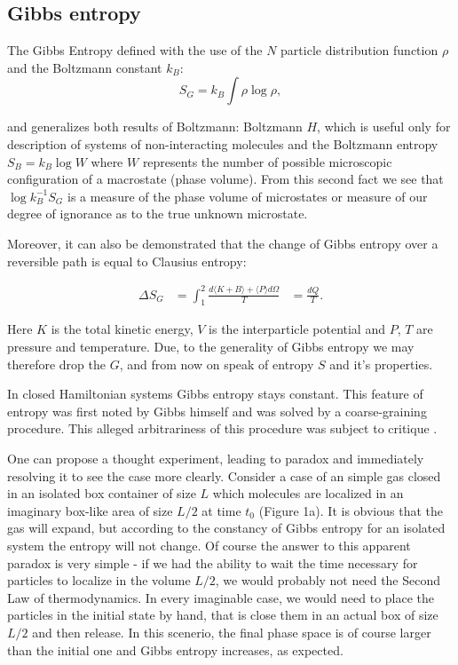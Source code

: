 \documentclass[a4paper,12pt]{article}
\begin{document}
\subsection{Gibbs entropy}
\label{Gibbs entropy}
The Gibbs Entropy defined with the use of the $N$ particle distribution function $ \rho $ and the Boltzmann constant $k_B$:
\begin{equation}
  S_G = k_B \int \rho \log{\rho},
\end{equation}

and generalizes both results of Boltzmann:
Boltzmann $H$, which is useful only for description of systems of non-interacting molecules\cite{Jaynes:1965gg} and the Boltzmann entropy $S_B = k_B \log{W}$ where $W$ represents the number of possible microscopic configuration of a macrostate (phase volume). 
From this second fact we see that $\log{k_B^{-1} S_G}$ is a measure of the phase volume of microstates or measure of our degree of ignorance as to the true unknown microstate.

Moreover, it can also be demonstrated\cite{Jaynes:1965gg} that the change of Gibbs entropy over a reversible path is equal to Clausius entropy:

\begin{equation}
\begin{aligned}
  \Delta S_G &= \int_1^2 \frac{d\langle K+ B \rangle+ \langle P \rangle d\Omega}{T}
  &= \frac{dQ}{T}.
\end{aligned}
\end{equation}

Here $K$ is the total kinetic energy, $V$ is the interparticle potential and $P$, $T$ are pressure and temperature. 
Due, to the generality of Gibbs entropy we may therefore drop the $G$, and from now on speak of entropy $S$ and it's properties.

In closed Hamiltonian systems Gibbs entropy stays constant.
This feature of entropy was first noted by Gibbs himself and was solved by a coarse-graining procedure\cite{Gibbs:1928tw}. This alleged arbitrariness of this procedure was subject to critique \cite{Evans:2241458}. %

One can propose a thought experiment, leading to paradox and immediately resolving it to see the case more clearly. Consider a case of an simple gas closed in an isolated box container of size $L$ which molecules are localized in an imaginary box-like area of size $L/2$ at time $t_0$ (Figure 1a). %
It is obvious that the gas will expand, but according to the constancy of Gibbs entropy for an isolated system the entropy will not change. Of course the answer to this apparent paradox is very simple - if we had the ability to wait the time necessary for particles to localize in the volume $L/2$, we would probably not need the Second Law of thermodynamics. In every imaginable case, we  would need to place the particles in the initial state by hand, that is close them in an actual box of size $L/2$ and then release. 
In this scenerio, the final phase space is of course larger than the initial one and Gibbs entropy increases, as expected.
\end{document}
